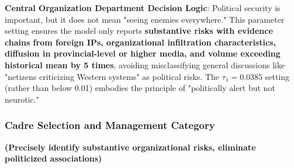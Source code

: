 \documentclass[11pt,a4paper]{report}
\newcommand{\tauone}{\tau_1}
\begin{document}
\textbf{Central Organization Department Decision Logic}: Political security is important, but it does not mean "seeing enemies everywhere." This parameter setting ensures the model only reports \textbf{substantive risks with evidence chains from foreign IPs, organizational infiltration characteristics, diffusion in provincial-level or higher media, and volume exceeding historical mean by 5 times}, avoiding misclassifying general discussions like "netizens criticizing Western systems" as political risks. The $\tauone=0.0385$ setting (rather than below 0.01) embodies the principle of "politically alert but not neurotic."

\clearpage

\subsubsection{Cadre Selection and Management Category}
\textbf{(Precisely identify substantive organizational risks, eliminate politicized associations)}
\end{document}

